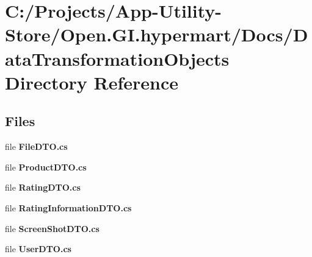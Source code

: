 \section{C\+:/\+Projects/\+App-\/\+Utility-\/\+Store/\+Open.G\+I.\+hypermart/\+Docs/\+Data\+Transformation\+Objects Directory Reference}
\label{dir_e84fcffe0071d70d45ac47d8fa172465}
\subsection*{Files}
\begin{DoxyCompactItemize}
\item 
file \textbf{ File\+D\+T\+O.\+cs}
\item 
file \textbf{ Product\+D\+T\+O.\+cs}
\item 
file \textbf{ Rating\+D\+T\+O.\+cs}
\item 
file \textbf{ Rating\+Information\+D\+T\+O.\+cs}
\item 
file \textbf{ Screen\+Shot\+D\+T\+O.\+cs}
\item 
file \textbf{ User\+D\+T\+O.\+cs}
\end{DoxyCompactItemize}

